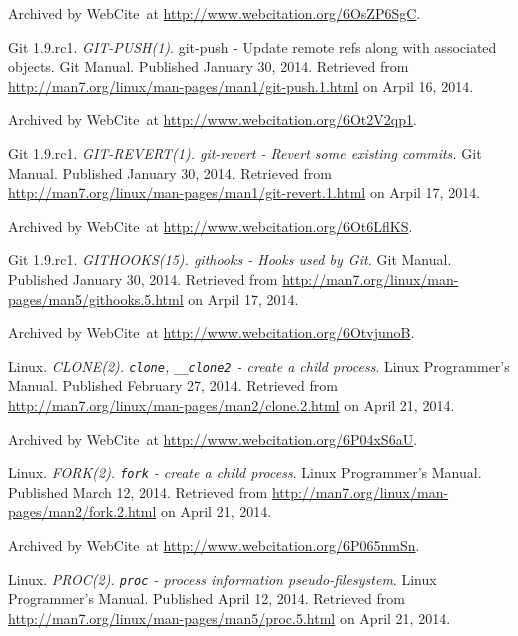 \begin{thebibliography}{9}
Archived by WebCite\textsuperscript{\textregistered}\ at
\url{http://www.webcitation.org/6OsZP6SgC}.


Git 1.9.rc1. \emph{GIT-PUSH(1)}. git-push - Update remote refs along with
associated objects. Git Manual. Published January 30, 2014. Retrieved from
\url{http://man7.org/linux/man-pages/man1/git-push.1.html} on Arpil 16, 2014.

Archived by WebCite\textsuperscript{\textregistered}\ at
\url{http://www.webcitation.org/6Ot2V2qp1}.


Git 1.9.rc1. \emph{GIT-REVERT(1). git-revert - Revert some existing commits.}
Git Manual. Published January 30, 2014. Retrieved from
\url{http://man7.org/linux/man-pages/man1/git-revert.1.html} on Arpil 17, 2014.

Archived by WebCite\textsuperscript{\textregistered}\ at
\url{http://www.webcitation.org/6Ot6LflKS}.


Git 1.9.rc1. \emph{GITHOOKS(15). githooks - Hooks used by Git.} Git Manual.
Published January 30, 2014. Retrieved from
\url{http://man7.org/linux/man-pages/man5/githooks.5.html} on Arpil 17, 2014.

Archived by WebCite\textsuperscript{\textregistered}\ at
\url{http://www.webcitation.org/6OtvjunoB}.


Linux. \emph{CLONE(2). \texttt{clone}, \texttt{\_\_clone2} - create a child
process}. Linux Programmer's Manual. Published February 27, 2014. Retrieved
from \url{http://man7.org/linux/man-pages/man2/clone.2.html} on April 21, 2014.

Archived by WebCite\textsuperscript{\textregistered}\ at
\url{http://www.webcitation.org/6P04xS6aU}.


Linux. \emph{FORK(2). \texttt{fork} - create a child process}. Linux
Programmer's Manual. Published March 12, 2014. Retrieved from
\url{http://man7.org/linux/man-pages/man2/fork.2.html} on April 21, 2014.

Archived by WebCite\textsuperscript{\textregistered}\ at
\url{http://www.webcitation.org/6P065nmSn}.


Linux. \emph{PROC(2). \texttt{proc} - process information pseudo-filesystem}.
Linux Programmer's Manual. Published April 12, 2014. Retrieved from
\url{http://man7.org/linux/man-pages/man5/proc.5.html} on April 21, 2014.


\end{thebibliography}
